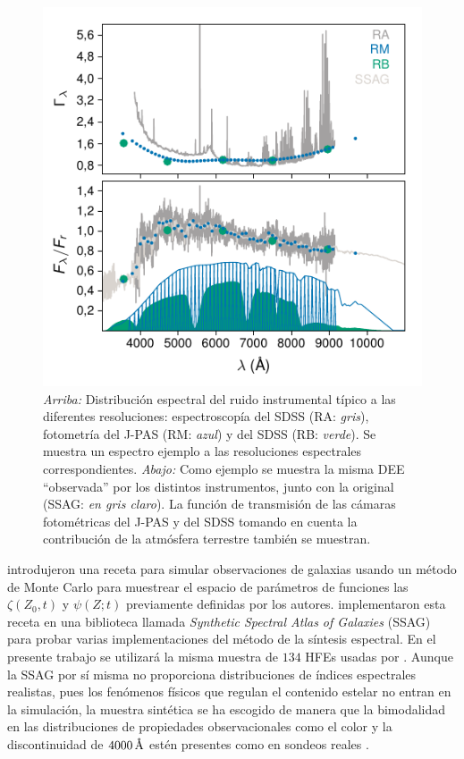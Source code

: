 \begin{figure}
\includegraphics{figures/sigma-spectrum}
%
\caption{\emph{Arriba:} Distribución espectral del ruido instrumental típico a las diferentes
resoluciones: espectroscopía del SDSS (RA: \emph{gris}), fotometría del J-PAS (RM: \emph{azul}) y
del SDSS (RB: \emph{verde}). Se muestra un espectro ejemplo a las resoluciones espectrales
correspondientes. \emph{Abajo:} Como ejemplo se muestra la misma DEE ``observada'' por los distintos
instrumentos, junto con la original (SSAG: \emph{en gris claro}). La función de transmisión de las
cámaras fotométricas del J-PAS y del SDSS tomando en cuenta la contribución de la atmósfera
terrestre también se muestran.}
%
\label{fig:sigma-spectrum}
\end{figure}

\citet{Chen2012} introdujeron una receta para simular observaciones de galaxias usando un método de
Monte Carlo para muestrear el espacio de parámetros de funciones las $\zeta(Z_0,t)$ y $\psi(Z;t)$
previamente definidas por los autores. \citet{Magris2015} implementaron esta receta en una
biblioteca llamada \emph{Synthetic Spectral Atlas of Galaxies} (SSAG) para probar varias
implementaciones del método de la síntesis espectral. En el presente trabajo se utilizará la misma
muestra de $134$ HFEs usadas por \citet{Magris2015}. Aunque la SSAG por sí misma no proporciona
distribuciones de índices espectrales realistas, pues los fenómenos físicos que regulan el contenido
estelar no entran en la simulación, la muestra sintética se ha escogido de manera que la bimodalidad
en las distribuciones de propiedades observacionales como el color y la discontinuidad de
$\unit[4000]{\AA}$ estén presentes como en sondeos reales \citep{Strateva2001, Kauffmann2003,
Baldry2004}.


